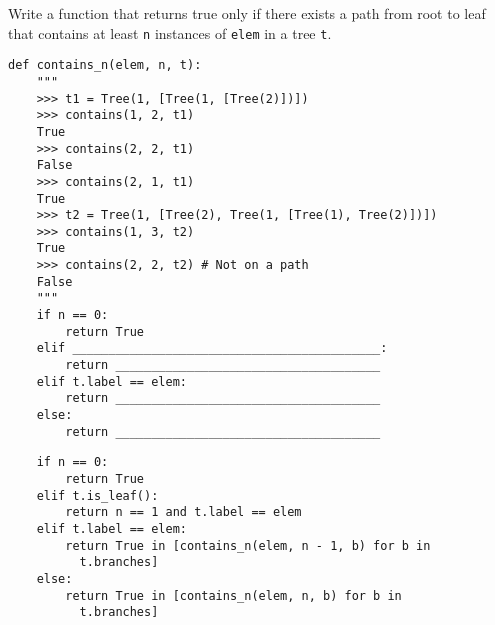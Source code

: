 \begin{blocksection}
\question Write a function that returns true only if there exists a path from root to leaf that contains at least \lstinline$n$ instances of \lstinline$elem$ in a tree \lstinline$t$.

\begin{lstlisting}
def contains_n(elem, n, t):
    """
    >>> t1 = Tree(1, [Tree(1, [Tree(2)])])
    >>> contains(1, 2, t1)
    True
    >>> contains(2, 2, t1)
    False
    >>> contains(2, 1, t1)
    True
    >>> t2 = Tree(1, [Tree(2), Tree(1, [Tree(1), Tree(2)])])
    >>> contains(1, 3, t2)
    True
    >>> contains(2, 2, t2) # Not on a path
    False
    """
    if n == 0:
        return True
    elif ___________________________________________:
        return _____________________________________
    elif t.label == elem:
        return _____________________________________
    else:
        return _____________________________________
\end{lstlisting}

\begin{solution}
\begin{lstlisting}
    if n == 0:
        return True
    elif t.is_leaf():
        return n == 1 and t.label == elem
    elif t.label == elem:
        return True in [contains_n(elem, n - 1, b) for b in     
          t.branches]
    else:
        return True in [contains_n(elem, n, b) for b in 
          t.branches]
\end{lstlisting}
\end{solution}
\end{blocksection}
